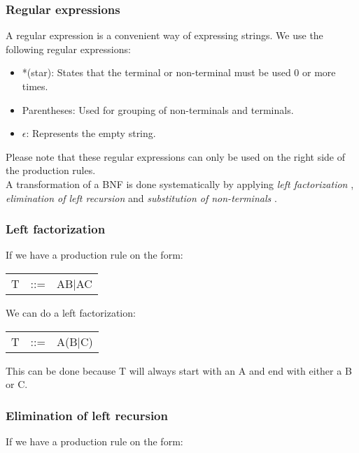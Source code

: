 	\subsubsection*{Regular expressions}
		A regular expression is a convenient way of expressing strings. We use the following regular expressions: \\
		\begin{itemize}
			\item *(star): States that the terminal or non-terminal must be used 0 or more times.
			\item Parentheses: Used for grouping of non-terminals and terminals.
			\item $\epsilon$: Represents the empty string.
		\end{itemize}
		Please note that these regular expressions can only be used on the right side of the production rules. \\
		
		A transformation of a BNF is done systematically by applying {\it left factorization }, 
		{\it elimination of left recursion} and {\it substitution of non-terminals }.
		
		\subsubsection*{Left factorization}
			If we have a production rule on the form: \\
			
			\begin{tabular}{l l l}
			\centering
				T		&	::=		&	AB$\mid$AC \\
			\end{tabular}
			
			We can do a left factorization: \\
			
			\begin{tabular}{l l l}
			\centering
				T		&	::=		&	A(B$\mid$C) \\
			\end{tabular}
			
			This can be done because T will always start with an A and end with either a B or C.
			
		\subsubsection*{Elimination of left recursion}
			If we have a production rule on the form: \\
			
